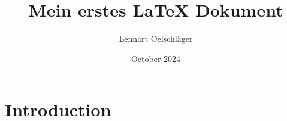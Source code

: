 \documentclass{article}
\title{Mein erstes LaTeX Dokument}
\author{Lennart Oelschläger}
\date{October 2024}
\begin{document}
\maketitle

\section{Introduction}
\end{document}

